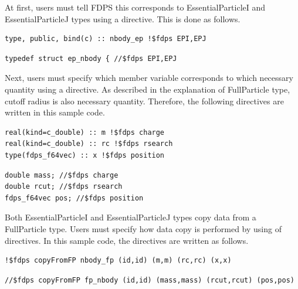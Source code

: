 \ifIF
At first, users must tell FDPS this \structure corresponds to \textsf{EssentialParticleI} and \textsf{EssentialParticleJ} types using a directive. This is done as follows.
\endifIF
\ifFtn
\begin{screen}
\begin{verbatim}
type, public, bind(c) :: nbody_ep !$fdps EPI,EPJ
\end{verbatim}
\end{screen}
\endifFtn
\ifC
\begin{screen}
\begin{verbatim}
typedef struct ep_nbody { //$fdps EPI,EPJ
\end{verbatim}
\end{screen}
\endifC
\ifIF
Next, users must specify which member variable corresponds to which necessary quantity using a directive. As described in the explanation of \textsf{FullParticle} type, cutoff radius is also necessary quantity. Therefore, the following directives are written in this sample code.
\endifIF
\ifFtn
\begin{screen}
\begin{verbatim}
real(kind=c_double) :: m !$fdps charge
real(kind=c_double) :: rc !$fdps rsearch
type(fdps_f64vec) :: x !$fdps position
\end{verbatim}
\end{screen}
\endifFtn
\ifC
\begin{screen}
\begin{verbatim}
double mass; //$fdps charge         
double rcut; //$fdps rsearch        
fdps_f64vec pos; //$fdps position   
\end{verbatim}
\end{screen}
\endifC
\ifIF
Both \textsf{EssentialParticleI} and \textsf{EssentialParticleJ} types copy data from a \textsf{FullParticle} type. Users must specify how data copy is performed by using of directives. In this sample code, the directives are written as follows.
\endifIF
\ifFtn
\begin{screen}
\begin{verbatim}
!$fdps copyFromFP nbody_fp (id,id) (m,m) (rc,rc) (x,x)
\end{verbatim}
\end{screen}
\endifFtn
\ifC
\begin{screen}
\begin{verbatim}
//$fdps copyFromFP fp_nbody (id,id) (mass,mass) (rcut,rcut) (pos,pos)
\end{verbatim}
\end{screen}
\endifC


